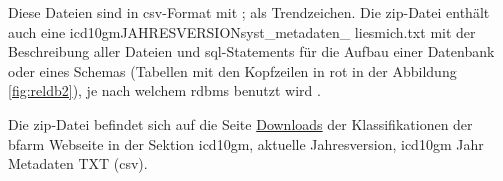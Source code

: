 Diese Dateien sind in \ac{csv}-Format mit \glqq ;\grqq{} als Trendzeichen. Die \ac{zip}-Datei enthält auch eine {\ttfamily icd10gmJAHRESVERSIONsyst\_metadaten\_ liesmich.txt} mit der Beschreibung aller Dateien und \ac{sql}-Statements für die Aufbau einer Datenbank oder eines Schemas (Tabellen mit den Kopfzeilen in rot in der Abbildung \ref{fig:reldb2}), je nach welchem \ac{rdbms} benutzt wird \cite{readmel}.

Die \ac{zip}-Datei befindet sich auf die Seite  \href{https://www.dimdi.de/dynamic/de/klassifikationen/downloads/}{Downloads} der Klassifikationen der \ac{bfarm} Webseite in der Sektion \ac{icd10gm}, aktuelle Jahresversion, \ac{icd10gm} {\ttfamily Jahr} Metadaten TXT (\acs{csv}).

